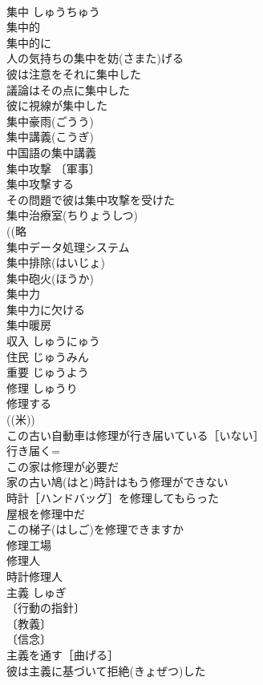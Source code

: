 \documentclass[8pt]{extreport}
\begin{document}
\begin{CJK}{UTF8}{min}
\\	集中	しゅうちゅう	
\\	集中的 
\\	集中的に 
\\	人の気持ちの集中を妨(さまた)げる 
\\	彼は注意をそれに集中した 
\\	議論はその点に集中した 
\\	彼に視線が集中した 
\\	集中豪雨(ごうう) 
\\	集中講義(こうぎ) 
\\	中国語の集中講義 
\\	集中攻撃 〔軍事〕
\\	集中攻撃する 
\\	その問題で彼は集中攻撃を受けた 
\\	集中治療室(ちりょうしつ) 
\\	((略
\\	集中データ処理システム 
\\	集中排除(はいじょ) 
\\	集中砲火(ほうか) 
\\	集中力 
\\	集中力に欠ける 
\\	集中暖房 
\\	収入	しゅうにゅう	
\\	住民	じゅうみん	
\\	重要	じゅうよう	
\\	修理	しゅうり	
\\	修理する 
\\	((米)) 
\\	この古い自動車は修理が行き届いている［いない］ 
\\	行き届く= 
\\	この家は修理が必要だ 
\\	家の古い鳩(はと)時計はもう修理ができない 
\\	時計［ハンドバッグ］を修理してもらった 
\\	屋根を修理中だ 
\\	この梯子(はしご)を修理できますか 
\\	修理工場 
\\	修理人 
\\	時計修理人 
\\	主義	しゅぎ	
\\	〔行動の指針〕
\\	〔教義〕
\\	〔信念〕
\\	主義を通す［曲げる］ 
\\	彼は主義に基づいて拒絶(きょぜつ)した 

\end{CJK}
\end{document}
